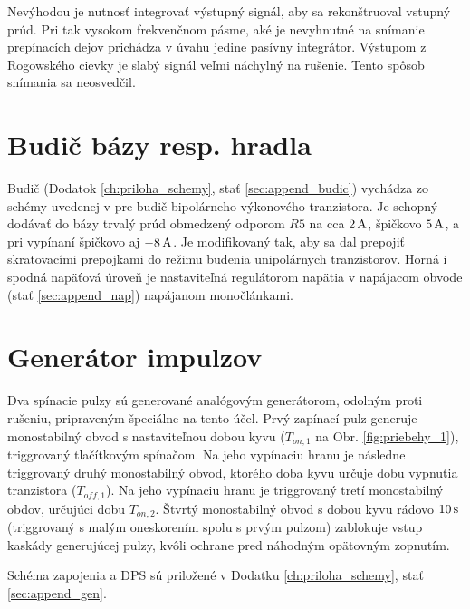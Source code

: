 Nevýhodou je nutnosť integrovať výstupný signál, aby sa rekonštruoval vstupný prúd. Pri tak vysokom frekvenčnom pásme, aké je nevyhnutné na snímanie prepínacích dejov prichádza v úvahu jedine pasívny integrátor. 
Výstupom z Rogowského cievky je slabý signál veľmi náchylný na rušenie. Tento spôsob snímania sa neosvedčil.


\section{Budič bázy resp. hradla} \label{sc:budič}
Budič (Dodatok \ref{ch:priloha_schemy}, stať \ref{sec:append_budic}) vychádza zo schémy uvedenej v \cite{patocka-skripta-3} pre budič bipolárneho výkonového tranzistora. Je schopný dodávať do bázy trvalý prúd obmedzený odporom $R5$ na cca $2\, \mathrm{A}$, špičkovo $5\, \mathrm{A}$, a pri vypínaní špičkovo aj $-8\, \mathrm{A}$. Je modifikovaný tak, aby sa dal prepojiť skratovacími prepojkami do režimu budenia unipolárnych tranzistorov. Horná i spodná napäťová úroveň je nastaviteľná regulátorom napätia v napájacom obvode (stať \ref{sec:append_nap}) napájanom monočlánkami.


\section{Generátor impulzov} \label{sec:generator}
Dva spínacie pulzy sú generované analógovým generátorom, odolným proti rušeniu, pripraveným špeciálne na tento účel. Prvý zapínací pulz generuje monostabilný obvod s nastaviteľnou dobou kyvu ($T_{on,1}$ na Obr. \ref{fig:priebehy_1}), triggrovaný tlačítkovým spínačom. Na jeho vypínaciu hranu je následne triggrovaný druhý monostabilný obvod, ktorého doba kyvu určuje dobu vypnutia tranzistora ($T_{off,1}$). Na jeho vypínaciu hranu je triggrovaný tretí monostabilný obdov, určujúci dobu $T_{on,2}$. Štvrtý monostabilný obvod  s dobou kyvu rádovo $10\, \mathrm{s}$ (triggrovaný s malým oneskorením spolu s prvým pulzom) zablokuje vstup kaskády generujúcej pulzy, kvôli ochrane pred náhodným opätovným zopnutím.

Schéma zapojenia a DPS sú priložené v Dodatku \ref{ch:priloha_schemy}, stať \ref{sec:append_gen}.

